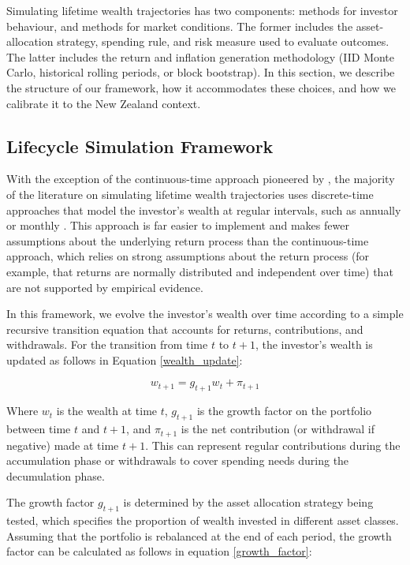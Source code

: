 \documentclass[11pt]{article}
\begin{document}
Simulating lifetime wealth trajectories has two components: methods for investor behaviour, and methods for market conditions. The former includes the asset-allocation strategy, spending rule, and risk measure used to evaluate outcomes. The latter includes the return and inflation generation methodology (IID Monte Carlo, historical rolling periods, or block bootstrap). In this section, we describe the structure of our framework, how it accommodates these choices, and how we calibrate it to the New Zealand context.


\subsection{Lifecycle Simulation Framework}

With the exception of the continuous-time approach pioneered by \textcite{merton1969lifetime}, the majority of the literature on simulating lifetime wealth trajectories uses discrete-time approaches that model the investor's wealth at regular intervals, such as annually or monthly \parencite[e.g.][]{anarkulova2025beyond, Makinen2024,estrada2014glidepath}. This approach is far easier to implement and makes fewer assumptions about the underlying return process than the continuous-time approach, which relies on strong assumptions about the return process (for example, that returns are normally distributed and independent over time) that are not supported by empirical evidence.

In this framework, we evolve the investor's wealth over time according to a simple recursive transition equation that accounts for returns, contributions, and withdrawals. For the transition from time \(t\) to \(t+1\), the investor's wealth is updated as follows in Equation \ref{wealth_update}:

\begin{equation}\label{wealth_update}
  w_{t+1} = g_{t+1} w_t + \pi_{t+1}
\end{equation}

Where \(w_t\) is the wealth at time \(t\), \(g_{t+1}\) is the growth factor on the portfolio between time \(t\) and \(t+1\), and \(\pi_{t+1}\) is the net contribution (or withdrawal if negative) made at time \(t+1\). This can represent regular contributions during the accumulation phase or withdrawals to cover spending needs during the decumulation phase.

The growth factor \(g_{t+1}\) is determined by the asset allocation strategy being tested, which specifies the proportion of wealth invested in different asset classes. Assuming that the portfolio is rebalanced at the end of each period, the growth factor can be calculated as follows in equation \ref{growth_factor}:
\end{document}
